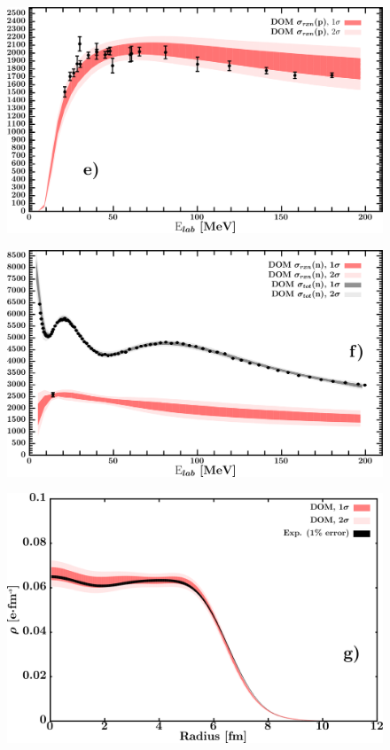 \documentclass[twocolumn,secnumarabic,amssymb, nobibnotes, aps, prl,
superscriptaddress, nobalancelastpage, draft]{revtex4}
\begin{document}
\begin{figure}[!htb]
\begin{minipage}{0.4\linewidth}
        \label{DOM_pb208_neutron_elastic}
    \end{minipage}
    \centering
    \begin{minipage}{0.4\linewidth}
        \centering
        \includegraphics[width=\linewidth]{figures/pb208_protonInelastic.png}
        \label{DOM_pb208_proton_inelastic}
    \end{minipage}\hspace{6pt}
    \begin{minipage}{0.4\linewidth}
        \centering
        \includegraphics[width=\linewidth]{figures/pb208_neutronInelastic.png}
        \label{DOM_pb208_neutron_inelastic}
    \end{minipage}
    \centering
    \begin{minipage}{0.4\linewidth}
        \centering
        \includegraphics[width=\linewidth]{figures/pb208_chargeDensity.png}

\end{minipage}
\end{figure}
\end{document}
